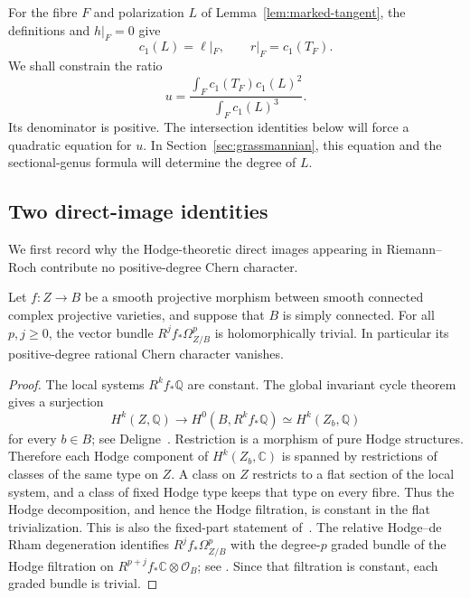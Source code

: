 For the fibre $F$ and polarization $L$ of
Lemma~\ref{lem:marked-tangent}, the definitions and $h|_F=0$ give
\begin{equation}\label{eq:fibre-polarization}
 c_1(L)=\ell|_F,
 \qquad r|_F=c_1(T_F).
\end{equation}
We shall constrain the ratio
\begin{equation}\label{eq:ratio-u}
 u=\frac{\int_F c_1(T_F)c_1(L)^2}{\int_F c_1(L)^3}.
\end{equation}
Its denominator is positive.
The intersection identities below will force a quadratic equation for
$u$. In Section~\ref{sec:grassmannian}, this equation and the
sectional-genus formula will determine the degree of $L$.

\subsection{Two direct-image identities}

We first record why the Hodge-theoretic direct images appearing in
Riemann--Roch contribute no positive-degree Chern character.

\begin{lemma}\label{lem:constant-hodge}
Let $f:Z\to B$ be a smooth projective morphism between smooth connected
complex projective varieties, and suppose that $B$ is simply connected.
For all $p,j\ge0$, the vector bundle $R^jf_*\Omega^p_{Z/B}$ is
holomorphically trivial. In particular its positive-degree rational
Chern character vanishes.
\end{lemma}
\begin{proof}
The local systems $R^kf_*\mathbb Q$ are constant. The global invariant
cycle theorem gives a surjection
\[
 H^k(Z,\mathbb Q)\longrightarrow H^0(B,R^kf_*\mathbb Q)
   \simeq H^k(Z_b,\mathbb Q)
\]
for every $b\in B$; see Deligne~\cite[Theorem~4.1.1(ii)]{Deligne1971}.
Restriction is a morphism of pure Hodge structures. Therefore each
Hodge component of $H^k(Z_b,\mathbb C)$ is spanned by restrictions of
classes of the same type on $Z$. A class on $Z$ restricts to a flat
section of the local system, and a class of fixed Hodge type keeps that
type on every fibre. Thus the Hodge decomposition, and hence the Hodge
filtration, is constant in the flat trivialization. This is also the
fixed-part statement of~\cite[Corollary~4.1.2]{Deligne1971}.
The relative Hodge--de Rham degeneration identifies
$R^jf_*\Omega^p_{Z/B}$ with the degree-$p$ graded bundle of the Hodge
filtration on $R^{p+j}f_*\mathbb C\otimes\mathcal O_B$; see
\cite[Section~2(a)--(c)]{Griffiths1970}. Since that
filtration is constant, each graded bundle is trivial.
\end{proof}

